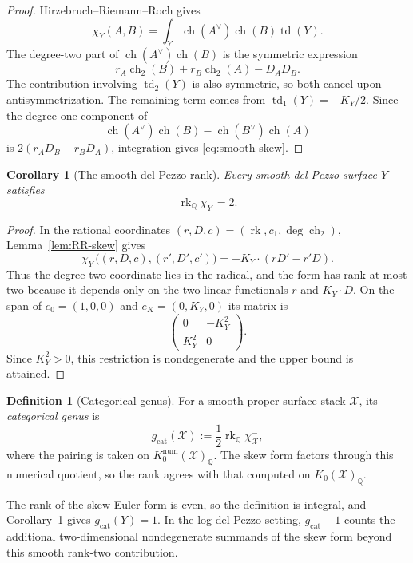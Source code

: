 \documentclass[11pt]{article}
\theoremstyle{plain}
\newtheorem{corollary}[theorem]{Corollary}
\theoremstyle{definition}
\newtheorem{definition}[theorem]{Definition}
\theoremstyle{remark}
\newcommand{\cX}{\mathcal X}
\newcommand{\rk}{\operatorname{rk}}
\newcommand{\Q}{\mathbb Q}
\newcommand{\1}{\mathbf 1}
\begin{document}
\begin{proof}
Hirzebruch--Riemann--Roch gives
\[
\chi_Y(A,B)=\int_Y
\operatorname{ch}(A^\vee)\operatorname{ch}(B)\operatorname{td}(Y).
\]
The degree-two part of $\operatorname{ch}(A^\vee)\operatorname{ch}(B)$ is the symmetric expression
\[
r_A\operatorname{ch}_2(B)+r_B\operatorname{ch}_2(A)-D_A D_B.
\]
The contribution involving $\operatorname{td}_2(Y)$ is also symmetric, so both cancel upon antisymmetrization.  The remaining term comes from $\operatorname{td}_1(Y)=-K_Y/2$.  Since the degree-one component of
\[
\operatorname{ch}(A^\vee)\operatorname{ch}(B)
-\operatorname{ch}(B^\vee)\operatorname{ch}(A)
\]
is $2(r_A D_B-r_BD_A)$, integration gives \eqref{eq:smooth-skew}.
\end{proof}

\begin{corollary}[The smooth del Pezzo rank]\label{ex:smooth-del-pezzo}
Every smooth del Pezzo surface $Y$ satisfies
\begin{equation}\label{eq:smooth-rank-two}
\rk_{\Q}\chi_Y^-=2.
\end{equation}
\end{corollary}

\begin{proof}
In the rational coordinates $(r,D,c)=(\rk,c_1,\deg\operatorname{ch}_2)$, Lemma~\ref{lem:RR-skew} gives
\[
\chi_Y^-\bigl((r,D,c),(r',D',c')\bigr)
=-K_Y\cdot(rD'-r'D).
\]
Thus the degree-two coordinate lies in the radical, and the form has rank at most two because it depends only on the two linear functionals $r$ and $K_Y\cdot D$.  On the span of $e_0=(1,0,0)$ and $e_K=(0,K_Y,0)$ its matrix is
\[
\begin{pmatrix}0&-K_Y^2\\K_Y^2&0\end{pmatrix}.
\]
Since $K_Y^2>0$, this restriction is nondegenerate and the upper bound is attained.
\end{proof}

\begin{definition}[Categorical genus]\label{def:categorical-genus}
For a smooth proper surface stack $\cX$, its \emph{categorical genus} is
\[
\boxed{
g_{\mathrm{cat}}(\cX)
:=\frac12\rk_{\Q}\chi^-_{\cX},}
\]
where the pairing is taken on $K_0^{\mathrm{num}}(\cX)_{\Q}$.  The skew form factors through this numerical quotient, so the rank agrees with that computed on $K_0(\cX)_{\Q}$.
\end{definition}

The rank of the skew Euler form is even, so the definition is integral, and Corollary~\ref{ex:smooth-del-pezzo} gives $g_{\mathrm{cat}}(Y)=1$.  In the log del Pezzo setting, $g_{\mathrm{cat}}-1$ counts the additional two-dimensional nondegenerate summands of the skew form beyond this smooth rank-two contribution.
\end{document}
